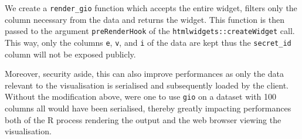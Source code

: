 \documentclass[
]{krantz}
\makeatletter
\newenvironment{Shaded}{\begin{snugshade}}{\end{snugshade}}
\newcommand{\CommentTok}[1]{\textcolor[rgb]{0.37,0.37,0.37}{\textit{#1}}}
\newcommand{\ControlFlowTok}[1]{\textcolor[rgb]{0.27,0.27,0.27}{\textbf{#1}}}
\newcommand{\DataTypeTok}[1]{\textcolor[rgb]{0.27,0.27,0.27}{#1}}
\newcommand{\DecValTok}[1]{\textcolor[rgb]{0.06,0.06,0.06}{#1}}
\newcommand{\KeywordTok}[1]{\textcolor[rgb]{0.27,0.27,0.27}{\textbf{#1}}}
\newcommand{\NormalTok}[1]{#1}
\newcommand{\OperatorTok}[1]{\textcolor[rgb]{0.43,0.43,0.43}{\textbf{#1}}}
\newcommand{\OtherTok}[1]{\textcolor[rgb]{0.37,0.37,0.37}{#1}}
\newcommand{\StringTok}[1]{\textcolor[rgb]{0.5,0.5,0.5}{#1}}
\newenvironment{kframe}{%
\medskip{}
\setlength{\fboxsep}{.8em}
 \def\at@end@of@kframe{}%
 \ifinner\ifhmode%
  \def\at@end@of@kframe{\end{minipage}}%
  \begin{minipage}{\columnwidth}%
 \fi\fi%
 \def\FrameCommand##1{\hskip\@totalleftmargin \hskip-\fboxsep
 \colorbox{shadecolor}{##1}\hskip-\fboxsep
     \hskip-\linewidth \hskip-\@totalleftmargin \hskip\columnwidth}%
 \MakeFramed {\advance\hsize-\width
   \@totalleftmargin\z@ \linewidth\hsize
   \@setminipage}}%
 {\par\unskip\endMakeFramed%
 \at@end@of@kframe}
\renewenvironment{Shaded}{\begin{kframe}}{\end{kframe}}
\makeatother
\begin{document}
\begin{Shaded}
\end{Shaded}

We create a \texttt{render\_gio} function which accepts the entire widget, filters only the column necessary from the data and returns the widget. This function is then passed to the argument \texttt{preRenderHook} of the \texttt{htmlwidgets::createWidget} call. This way, only the columns \texttt{e}, \texttt{v}, and \texttt{i} of the data are kept thus the \texttt{secret\_id} column will not be exposed publicly.

\begin{Shaded}
\end{Shaded}

Moreover, security aside, this can also improve performances as only the data relevant to the visualisation is serialised and subsequently loaded by the client. Without the modification above, were one to use \texttt{gio} on a dataset with 100 columns all would have been serialised, thereby greatly impacting performances both of the R process rendering the output and the web browser viewing the visualisation.
\end{document}
